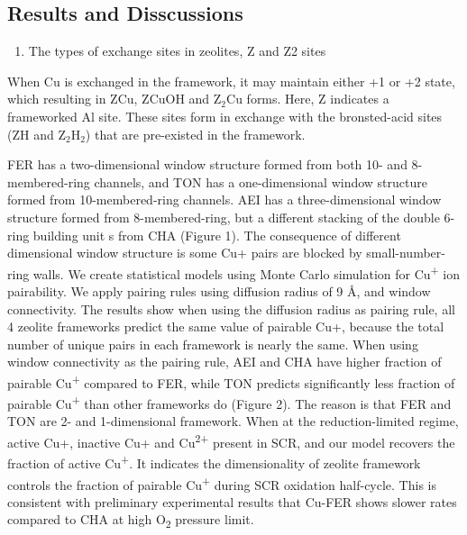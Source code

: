 \documentclass[12pt]{article}
\begin{document}
\subsection*{Results and Disscussions}
\begin{enumerate}
\item The types of exchange sites in zeolites, Z and Z2 sites
\end{enumerate}

When Cu is exchanged in the framework, it may maintain either +1 or +2 state, which resulting in ZCu, ZCuOH and Z$_{2}$Cu forms. Here, Z indicates a frameworked Al site. These sites form in exchange with the bronsted-acid sites (ZH and Z$_{2}$H$_{2}$) that are pre-existed in the framework.

FER has a two-dimensional window structure formed from both 10- and 8-membered-ring channels, and TON has a one-dimensional window structure formed from 10-membered-ring channels. AEI has a three-dimensional window structure formed from 8-membered-ring, but a different stacking of the double 6-ring building unit s from CHA (Figure 1). The consequence of different dimensional window structure is some Cu+ pairs are blocked by small-number-ring walls. We create statistical models using Monte Carlo simulation for Cu\textsuperscript{+} ion pairability. We apply pairing rules using diffusion radius of 9 Å, and window connectivity. The results show when using the diffusion radius as pairing rule, all 4 zeolite frameworks predict the same value of pairable Cu+, because the total number of unique pairs in each framework is nearly the same. When using window connectivity as the pairing rule, AEI and CHA have higher fraction of pairable Cu\textsuperscript{+} compared to FER, while TON predicts significantly less fraction of pairable Cu\textsuperscript{+} than other frameworks do (Figure 2). The reason is that FER and TON are 2- and 1-dimensional framework. When at the reduction-limited regime, active Cu+, inactive Cu+ and Cu\textsuperscript{2+} present in SCR, and our model recovers the fraction of active Cu\textsuperscript{+}. It indicates the dimensionality of zeolite framework controls the fraction of pairable Cu\textsuperscript{+} during SCR oxidation half-cycle. This is consistent with preliminary experimental results that Cu-FER shows slower rates compared to CHA at high O\textsubscript{2} pressure limit.
\end{document}
